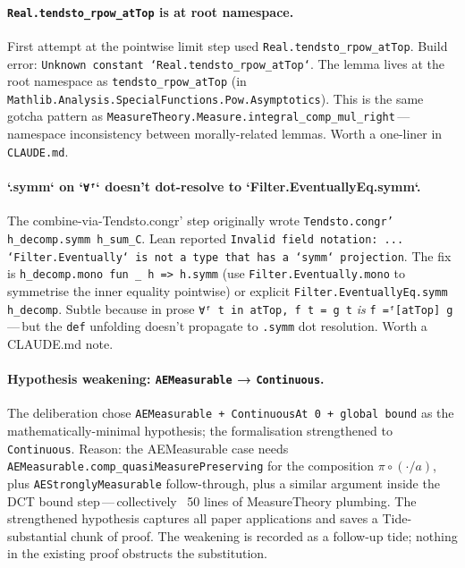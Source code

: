 \documentclass[11pt]{article}
\begin{document}
\paragraph{\texttt{Real.tendsto\_rpow\_atTop} is at root namespace.}
First attempt at the pointwise limit step used
\texttt{Real.tendsto\_rpow\_atTop}. Build error: \texttt{Unknown
constant `Real.tendsto\_rpow\_atTop`}. The lemma lives at the root
namespace as \texttt{tendsto\_rpow\_atTop} (in
\texttt{Mathlib.Analysis.SpecialFunctions.Pow.Asymptotics}). This is
the same gotcha pattern as
\texttt{MeasureTheory.Measure.integral\_comp\_mul\_right}\,---\,namespace
inconsistency between morally-related lemmas. Worth a one-liner in
\texttt{CLAUDE.md}.

\paragraph{`.symm` on `\texttt{∀ᶠ}` doesn't dot-resolve to `Filter.EventuallyEq.symm`.}
The combine-via-Tendsto.congr' step originally wrote
\texttt{Tendsto.congr' h\_decomp.symm h\_sum\_C}. Lean reported
\texttt{Invalid field notation: ... `Filter.Eventually` is not a
type that has a `symm` projection}. The fix is
\texttt{h\_decomp.mono fun \_ h => h.symm} (use
\texttt{Filter.Eventually.mono} to symmetrise the inner equality
pointwise) or explicit
\texttt{Filter.EventuallyEq.symm h\_decomp}. Subtle because in prose
\texttt{∀ᶠ t in atTop, f t = g t} \emph{is} \texttt{f =ᶠ[atTop] g}\,---\,but
the \texttt{def} unfolding doesn't propagate to \texttt{.symm} dot
resolution. Worth a CLAUDE.md note.

\paragraph{Hypothesis weakening: \texttt{AEMeasurable} → \texttt{Continuous}.}
The deliberation chose \texttt{AEMeasurable + ContinuousAt 0 + global bound}
as the mathematically-minimal hypothesis; the formalisation
strengthened to \texttt{Continuous}. Reason: the AEMeasurable case
needs \texttt{AEMeasurable.comp\_quasiMeasurePreserving} for the
composition $\pi \circ (\cdot/a)$, plus \texttt{AEStronglyMeasurable}
follow-through, plus a similar argument inside the DCT bound step\,---\,collectively
~50 lines of MeasureTheory plumbing. The strengthened hypothesis
captures all paper applications and saves a Tide-substantial chunk
of proof. The weakening is recorded as a follow-up tide; nothing in
the existing proof obstructs the substitution.
\end{document}
